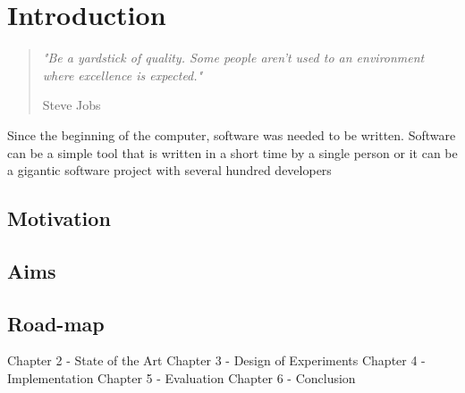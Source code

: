 \chapter{Introduction}

\begin{quote}
\centering 
\em %
"Be a yardstick of quality. Some people aren’t used to an environment where excellence is expected."

\medskip
\raggedleft
Steve Jobs
\end{quote}
\vspace*{\fill}

\begin{flushleft}
Since the beginning of the computer, software was needed to be written. Software can be a simple tool that is written in a short time by a single person or it can be a gigantic software project with several hundred developers \cite{cusumano1997microsoft}
\end{flushleft}

\section{Motivation}

\section{Aims}

\section{Road-map}
	Chapter 2 - State of the Art
	Chapter 3 - Design of Experiments 
	Chapter 4 - Implementation
	Chapter 5 - Evaluation
	Chapter 6 - Conclusion 

